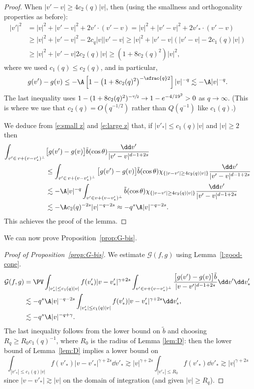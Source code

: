 \begin{proof}
When $|v'-v| \ge 4 c_2(q)|v|$, then (using the smallness and orthogonality
properties as before):
\begin{align*}
|v'|^2 & = |v|^2 + |v'-v|^2 + 2 v'\cdot (v'-v) = |v|^2 + |v'-v|^2 + 2
v'_* \cdot (v'-v)\\
& \ge |v|^2 + |v'-v|^2 -2c_q |v||v'-v| \ge |v|^2 + |v'-v|
\left( |v'-v| -2c_1(q) |v| \right) \\
& \ge |v|^2 + |v'-v| 2c_2(q) |v| \ge (1 + 8 c_2(q)^2) |v|^2,
\end{align*}
where we used $c_1(q) \le c_2(q)$, and in particular,
\begin{equation}\label{e:large z}
g(v') - g(v) \le - \A \left[1-\left(1+8c_2(q)^2\right)^{-\sfrac{q}2}
\right]|v|^{-q} \lesssim -\A |v|^{-q}.
\end{equation}
The last inequality uses $1 - (1+8 c_2(q)^2)^{-\sfrac{q}2} \to 1 - e^{-4/19^2} >0$
as $q \to \infty$. (This is where we use that $c_2(q) = O(q^{-1/2})$
rather than $Q(q^{-1})$ like $c_1(q)$.)

We deduce from \eqref{e:small z} and \eqref{e:large z} that, if
$|v'_*| \le c_1(q) |v|$ and $|v| \ge 2$ then
\begin{align*}
\int_{v' \in \, v + (v-v'_*)^\bot}& \big[ g(v') - g(v) \big] \tilde
b(\cos \theta) \frac{\dd v'}{|v'-v|^{d-1+2s}} \\
& \le \int_{v' \in \, v + (v-v'_*)^\bot} \big[ g(v') - g(v) \big] \tilde
b(\cos \theta) \chi_{\{|v-v'| \ge 4c_2(q) |v|\}} \frac{\dd v'}{|v'-v|^{d-1+2s}} \\
& \lesssim - \A |v|^{-q} \int_{v' \in v + (v-v'_*)^\bot} \tilde
b(\cos \theta) \chi_{\{|v-v'| \ge 4c_2(q) |v|\}} \frac{\dd v'}{|v'-v|^{d-1+2s}} \\
& \lesssim - \A c_2(q)^{-2s}|v|^{-q-2s} \approx -q^s \A |v|^{-q-2s}.
\end{align*}
This achieves the proof of the lemma.
\end{proof}
We can now prove Proposition~\ref{prop:G-bis}.

\begin{proof}[Proof of Proposition~\ref{prop:G-bis}]
We estimate $\mathcal G(f,g)$ using Lemma~\ref{l:good-cone}.
\begin{align*}
\mathcal{G} (f,g) & = \PV \int_{|v'_*| \le c_1(q) |v|} f(v'_*)
|v-v'_*|^{\gamma+2s} \int_{v' \in v +
(v-v'_*)^\bot}
\frac{\big[ g(v')-g(v) \big] \tilde b}{|v-v'|^{d-1+2s}}
\dd v' \dd v'_* \\
&\lesssim - q^{s} \A |v|^{-q-2s} \int_{|v'_*| \le c_1(q) |v|} f(v'_*) |v-v'_*|^{\gamma+2s} \dd v'_*, \\
&\lesssim - q^{s} \A |v|^{-q+\gamma}.
\end{align*}
The last inequality follows from the lower bound on $\tilde b$ and
choosing $R_q \ge R_0 c_1(q)^{-1}$, where $R_0$ is the radius of Lemma
\ref{lem:D}: then the lower bound of Lemma~\ref{lem:D} implies a lower
bound on
\[
\int_{|v'_*| \le c_1(q) |v|} f(v'_*) |v-v'_*|^{\gamma+2s} \dd v'_* \gtrsim
|v|^{\gamma+2s} \int_{|v'_*| \le R_0} f(v'_*) \dd v'_* \gtrsim |v|^{\gamma+2s}
\]
since $|v-v'_*| \gtrsim |v|$ on the domain of integration (and given
$|v| \ge R_q$).
\end{proof}

